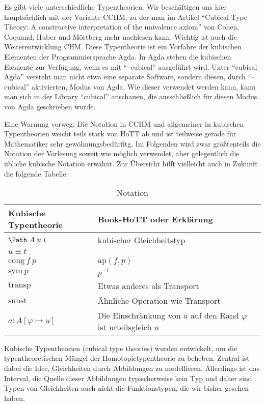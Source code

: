 Es gibt viele unterschiedliche Typentheorien.
Wir beschäftigen uns hier hauptsächlich mit der Variante CCHM, zu der man im Artikel ``Cubical Type Theory: A constructive interpretation of the univalence axiom'' von Cohen, Coquand, Huber und Mörtberg mehr nachlesen kann. Wichtig ist auch die Weiterentwicklung CHM.
Diese Typentheorie ist ein Vorfahre der kubischen Elementen der Programmiersprache Agda.
In Agda stehen die kubischen Elemente zur Verfügung, wenn es mit ``--cubical'' ausgeführt wird.
Unter ``cubical Agda'' versteht man nicht etwa eine separate Software, sondern diesen, durch ``--cubical'' aktivierten, Modus von Agda.
Wie dieser verwendet werden kann, kann man sich in der Library ``cubical'' anschauen, die ausschließlich für diesen Modus von Agda geschrieben wurde.

Eine Warnung vorweg: Die Notation in CCHM und allgemeiner in kubischen Typentheorien weicht teils stark von HoTT ab und ist teilweise gerade für Mathematiker sehr gewöhnungsbedürfitg. Im Folgenden wird zwar größtenteils die Notation der Vorlesung soweit wie möglich verwendet, aber gelegentlich die übliche kubische Notation erwähnt. Zur Übersicht hilft vielleicht auch in Zukunft die folgende Tabelle:

\begin{table}[h]
  \centering
  \begin{tabular}{p{4cm}p{10cm}}
    Kubische Typentheorie         & Book-HoTT oder Erklärung \\
    \hline
    $\Path\ A\ u\ t$              & kubischer Gleichheitstyp \\
    $u\equiv t$                   & \\
    $\mathrm{cong}\ f\ p$         & $\mathrm{ap}(f,p)$ \\
    $\mathrm{sym}\ p$             & $p^{-1}$ \\
    $\mathrm{transp}$             & Etwas anderes als Transport \\
    $\mathrm{subst}$              & Ähnliche Operation wie Transport \\
    $a:A[\varphi\mapsto u]$       & Die Einschränkung von $a$ auf den Rand $\varphi$ ist urteilsgleich $u$
  \end{tabular}
  \caption{Notation}
  \label{tab:notation-ctt}
\end{table}


Kubische Typentheorien (cubical type theories) wurden entwickelt,
um die typentheoretischen Mängel der Homotopietypentheorie zu beheben.
Zentral ist dabei die Idee, Gleichheiten durch Abbildungen zu modellieren.
Allerdings ist das Interval, die Quelle dieser Abbildungen typischerweise kein Typ und daher sind Typen von Gleichheiten auch nicht die Funktionstypen, die wir bisher gesehen haben.

